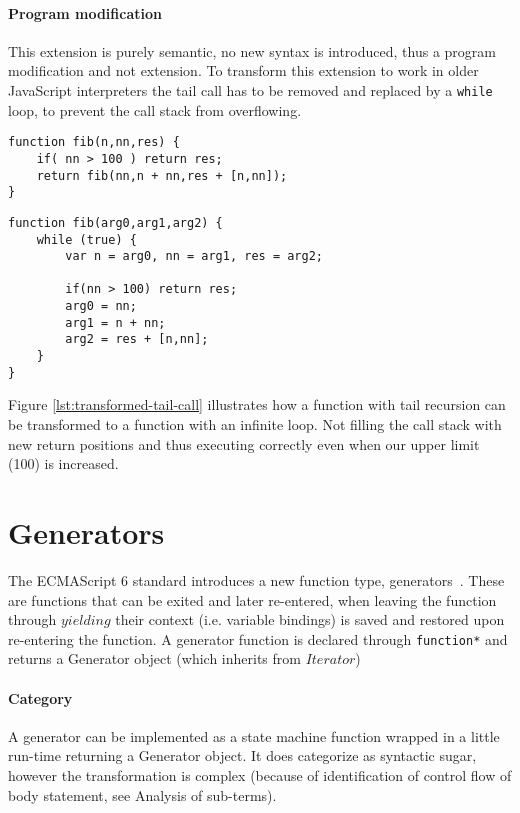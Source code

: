 \paragraph{Program modification}
This extension is purely semantic, no new syntax is introduced, thus a program modification and not extension. To transform this extension to work in older JavaScript interpreters the tail call has to be removed and replaced by a \lstinline$while$ loop, to prevent the call stack from overflowing.

\begin{lstlisting}[caption={Function with tail recursion},label={lst:tail-call}]
function fib(n,nn,res) {
	if( nn > 100 ) return res;
	return fib(nn,n + nn,res + [n,nn]);
}
\end{lstlisting}

\begin{lstlisting}[caption={Semantically identical function, without tail recursion},label={lst:transformed-tail-call}]
function fib(arg0,arg1,arg2) {
	while (true) {
		var n = arg0, nn = arg1, res = arg2;

		if(nn > 100) return res;
		arg0 = nn;
		arg1 = n + nn;
		arg2 = res + [n,nn];
	}
}
\end{lstlisting}

Figure \ref{lst:transformed-tail-call} illustrates how a function with tail recursion can be transformed to a function with an infinite loop. Not filling the call stack with new return positions and thus executing correctly even when our upper limit (100) is increased.

\section{Generators} \label{generators}
The ECMAScript 6 standard introduces a new function type, generators~\cite[14.4]{SpecJS}. These are functions that can be exited and later re-entered, when leaving the function through $yielding$ their context (i.e. variable bindings) is saved and restored upon re-entering the function. A generator function is declared through \lstinline$function*$ and returns a Generator object (which inherits from $Iterator$)

\paragraph{Category}
A generator can be implemented as a state machine function wrapped in a little run-time returning a Generator object. It does categorize as syntactic sugar, however the transformation is complex (because of identification of control flow of body statement, see Analysis of sub-terms).

